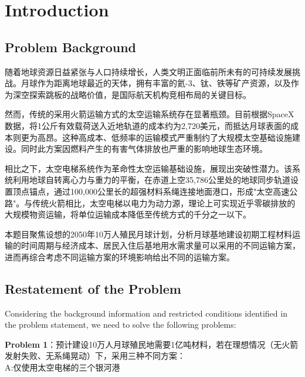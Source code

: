 \begin{longtable}[]{@{}lll@{}}
\toprule
\endhead
& & \\
\bottomrule
\end{longtable}

\hypertarget{introduction}{%
\section{Introduction}\label{introduction}}

\hypertarget{problem-background}{%
\subsection{Problem Background}\label{problem-background}}

随着地球资源日益紧张与人口持续增长，人类文明正面临前所未有的可持续发展挑战。月球作为距离地球最近的天体，拥有丰富的氦-3、钛、铁等矿产资源，以及作为深空探索跳板的战略价值，是国际航天机构竞相布局的关键目标。

然而，传统的采用火箭运输方式的太空运输系统存在显著瓶颈。目前根据SpaceX数据，将1公斤有效载荷送入近地轨道的成本约为2,720美元，而抵达月球表面的成本则更为高昂。这种高成本、低频率的运输模式严重制约了大规模太空基础设施建设。同时此方案因燃料产生的有害气体排放也严重的影响地球生态环境。

相比之下，太空电梯系统作为革命性太空运输基础设施，展现出突破性潜力。该系统利用地球自转离心力与重力的平衡，在赤道上空35,786公里处的地球同步轨道设置顶点锚点，通过100,000公里长的超强材料系绳连接地面港口，形成"太空高速公路"。与传统火箭相比，太空电梯以电力为动力源，理论上可实现近乎零碳排放的大规模物资运输，将单位运输成本降低至传统方式的千分之一以下。

本题目聚焦设想的2050年10万人殖民月球计划，分析月球基地建设初期工程材料运输的时间周期与经济成本、居民入住后基地用水需求量可以采用的不同运输方案，进而再综合考虑不同运输方案的环境影响给出不同的运输方案。

\hypertarget{restatement-of-the-problem}{%
\subsection{Restatement of the
Problem}\label{restatement-of-the-problem}}

Considering the background information and restricted conditions
identified in the problem statement, we need to solve the following
problems:

\textbf{Problem
1}：预计建设10万人月球殖民地需要1亿吨材料，若在理想情况（无火箭发射失败、无系绳晃动）下，采用三种不同方案：\\
A:仅使用太空电梯的三个银河港

